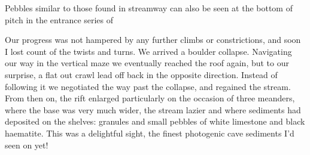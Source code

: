  \begin{marginfigure}
	\checkoddpage \ifoddpage \forcerectofloat \else \forceversofloat \fi
	\centering
	\caption{Pebbles similar to those found in \protect{} streamway can also be seen at the bottom of \protect{} pitch in the entrance series of \protect{} }
	\label{push your luck pebbles}
\end{marginfigure}

Our progress was not hampered by any further climbs or constrictions, and soon I lost count of the twists and turns. We arrived a boulder collapse. Navigating our way in the vertical maze we eventually reached the roof again, but to our surprise, a flat out crawl lead off back in the opposite direction. Instead of following it we negotiated the way past the collapse, and regained the stream. From then on, the rift enlarged particularly on the occasion of three meanders, where the base was very much wider, the stream lazier and where sediments had deposited on the shelves: granules and small pebbles of white limestone and black haematite. This was a delightful sight, the finest photogenic cave sediments I'd seen on  yet!

